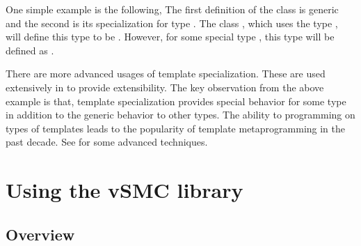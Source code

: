 One simple example is the following,
The first definition of the class  is generic and the
second is its specialization for type . The class
, which uses the type , will define
this type to be . However, for some special type
, this type will be defined as .

There are more advanced usages of template specialization. These are used
extensively in \vsmc to provide extensibility. The key observation from the
above example is that, template specialization provides special behavior for
some type in addition to the generic behavior to other types. The ability to
programming on types of \cpp templates leads to the popularity of \cpp
template metaprogramming in the past decade. See \cite{moderncpp} for some
advanced techniques.

\section{Using the vSMC library}
\label{sec:Using the vSMC library}

\subsection{Overview}

